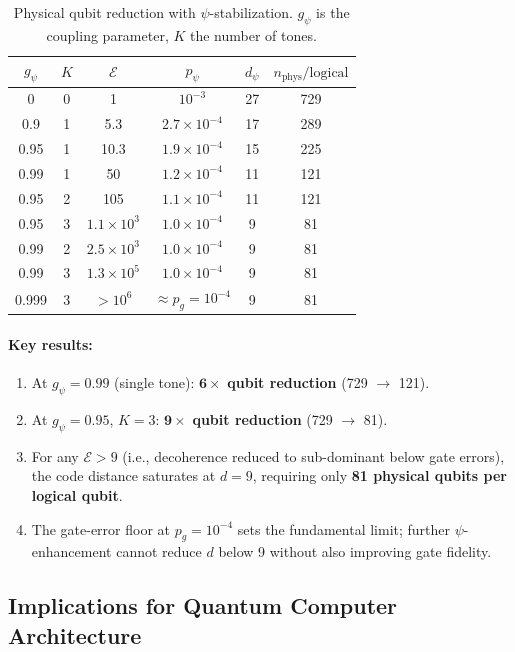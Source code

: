 \documentclass[aps,prl,twocolumn,superscriptaddress,nofootinbib,longbibliography]{revtex4-2}
\begin{document}
\begin{table}[h]
\caption{Physical qubit reduction with $\psi$-stabilization.
$g_\psi$ is the coupling parameter, $K$ the number of tones.}
\label{tab:qubits}
\begin{ruledtabular}
\begin{tabular}{cccccc}
$g_\psi$ & $K$ & $\mathcal{E}$ & $p_\psi$ & $d_\psi$ &
$n_{\text{phys}}/\text{logical}$ \\
\hline
0 & 0 & 1 & $10^{-3}$ & 27 & 729 \\
0.9 & 1 & 5.3 & $2.7\times10^{-4}$ & 17 & 289 \\
0.95 & 1 & 10.3 & $1.9\times10^{-4}$ & 15 & 225 \\
0.99 & 1 & 50 & $1.2\times10^{-4}$ & 11 & 121 \\
0.95 & 2 & 105 & $1.1\times10^{-4}$ & 11 & 121 \\
0.95 & 3 & $1.1\times10^3$ & $1.0\times10^{-4}$ & 9 & 81 \\
0.99 & 2 & $2.5\times10^3$ & $1.0\times10^{-4}$ & 9 & 81 \\
0.99 & 3 & $1.3\times10^5$ & $1.0\times10^{-4}$ & 9 & 81 \\
0.999 & 3 & $>10^6$ & $\approx p_g = 10^{-4}$ & 9 & 81 \\
\end{tabular}
\end{ruledtabular}
\end{table}

\paragraph{Key results:}
\begin{enumerate}
\item At $g_\psi = 0.99$ (single tone): $\mathbf{6\times}$
\textbf{qubit reduction} (729 $\to$ 121).
\item At $g_\psi = 0.95$, $K = 3$: $\mathbf{9\times}$
\textbf{qubit reduction} (729 $\to$ 81).
\item For any $\mathcal{E} > 9$ (i.e., decoherence reduced to
sub-dominant below gate errors), the code distance saturates at
$d = 9$, requiring only \textbf{81 physical qubits per logical qubit}.
\item The gate-error floor at $p_g = 10^{-4}$ sets the fundamental
limit; further $\psi$-enhancement cannot reduce $d$ below 9 without
also improving gate fidelity.
\end{enumerate}

\subsection{Implications for Quantum Computer Architecture}
\end{document}
